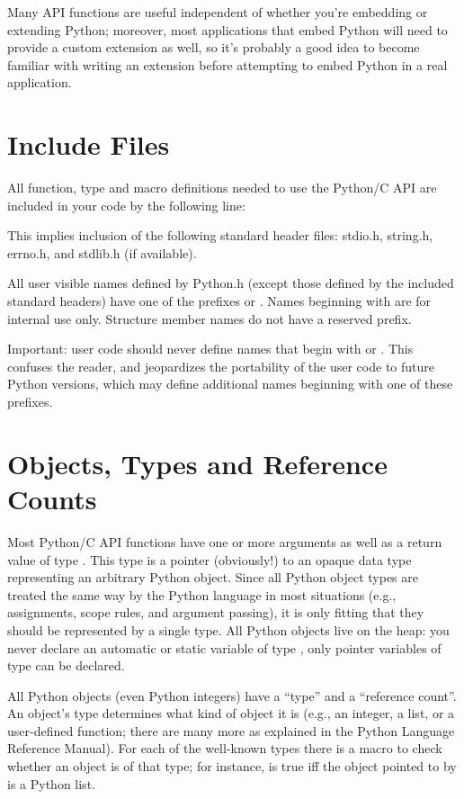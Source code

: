 \documentclass[twoside,openright]{report}
\begin{document}
Many API functions are useful independent of whether you're embedding 
or extending Python; moreover, most applications that embed Python 
will need to provide a custom extension as well, so it's probably a 
good idea to become familiar with writing an extension before 
attempting to embed Python in a real application.

\section{Include Files}

All function, type and macro definitions needed to use the Python/C
API are included in your code by the following line:


This implies inclusion of the following standard header files:
stdio.h, string.h, errno.h, and stdlib.h (if available).

All user visible names defined by Python.h (except those defined by
the included standard headers) have one of the prefixes  or
.  Names beginning with  are for internal use
only.  Structure member names do not have a reserved prefix.

Important: user code should never define names that begin with
 or .  This confuses the reader, and jeopardizes
the portability of the user code to future Python versions, which may
define additional names beginning with one of these prefixes.

\section{Objects, Types and Reference Counts}

Most Python/C API functions have one or more arguments as well as a
return value of type .  This type is a pointer
(obviously!)  to an opaque data type representing an arbitrary Python
object.  Since all Python object types are treated the same way by the
Python language in most situations (e.g., assignments, scope rules,
and argument passing), it is only fitting that they should be
represented by a single \C{} type.  All Python objects live on the heap:
you never declare an automatic or static variable of type
, only pointer variables of type  can 
be declared.

All Python objects (even Python integers) have a ``type'' and a 
``reference count''.  An object's type determines what kind of object 
it is (e.g., an integer, a list, or a user-defined function; there are 
many more as explained in the Python Language Reference Manual).  For 
each of the well-known types there is a macro to check whether an 
object is of that type; for instance,  is true 
iff the object pointed to by  is a Python list.
\end{document}
